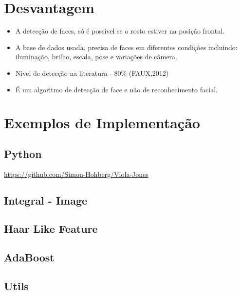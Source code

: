 \documentclass[12pt,a4paper]{article}
\begin{document}
\section{Desvantagem}
\begin{itemize}
	\item A detecção de faces, só é possível se o rosto estiver na posição frontal.
	\item A base de dados usada, precisa de faces em diferentes condições incluindo: iluminação, brilho, escala, pose e variações de câmera.
	\item Nível de detecção na literatura - 80\% (FAUX,2012)
	\item É um algoritmo de detecção de face e não de reconhecimento facial.
\end{itemize}

\section{Exemplos de Implementação}

\subsection{Python}
\url{https://github.com/Simon-Hohberg/Viola-Jones}

\subsection{Integral - Image}

 
 
 \subsection{Haar Like Feature}

 

\subsection{AdaBoost}


\subsection{Utils}
\end{document}
